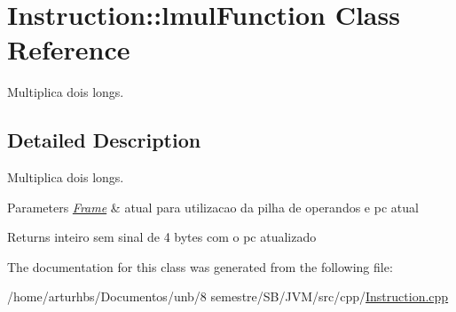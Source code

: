 \hypertarget{classInstruction_1_1lmulFunction}{}\section{Instruction\+:\+:lmul\+Function Class Reference}
\label{classInstruction_1_1lmulFunction}


Multiplica dois longs.  




\subsection{Detailed Description}
Multiplica dois longs. 


\begin{DoxyParams}{Parameters}
{\em \hyperlink{classFrame}{Frame}} & atual para utilizacao da pilha de operandos e pc atual \\
\hline
\end{DoxyParams}
\begin{DoxyReturn}{Returns}
inteiro sem sinal de 4 bytes com o pc atualizado 
\end{DoxyReturn}


The documentation for this class was generated from the following file\+:\begin{DoxyCompactItemize}
\item 
/home/arturhbs/\+Documentos/unb/8 semestre/\+S\+B/\+J\+V\+M/src/cpp/\hyperlink{Instruction_8cpp}{Instruction.\+cpp}\end{DoxyCompactItemize}
